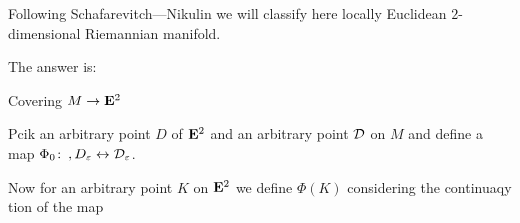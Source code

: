 
   Following Schafarevitch---Nikulin we will classify here
  locally Euclidean $2$-dimensional Riemannian manifold.




   The answer is:



\baselineskip=14pt
\def\vare {\varepsilon}
\def\A {{\bf A}}
\def\t {\tilde}
\def\bs {{\bf s}}
\def\a {\alpha}
\def\d {\delta}
\def\K {{\bf K}}
\def\N {{\bf N}}
\def\w {\omega}
\def\s {{\sigma}}
\def\S {{\Sigma}}
\def\s {{\sigma}}
\def\p{\partial}
\def\vare{{\varepsilon}}
\def\Q {{\bf Q}}
\def\D {{\cal D}}
\def\G {{\Gamma}}
\def\C {{\bf C}}
\def\L {{\cal L}}
\def\F {{\cal F}}
\def\Z {{\bf Z}}
\def\U  {{\cal U}}
\def\H {{\bf H}}
\def\R  {{\bf R}}
\def\S  {{\bf S}}
\def\E  {{\bf E}}
\def\l {\lambda}
\def\degree {{\bf {\rm degree}\,\,}}
\def \finish {${\,\,\vrule height1mm depth2mm width 8pt}$}
\def \m {\medskip}
\def\p {\partial}
\def\r {{\bf r}}
\def\pt {{\bf pt}}
\def\v {{\bf v}}
\def\n {{\bf n}}
\def\t {{\bf t}}
\def\b {{\bf b}}
\def\c {{\bf c }}
\def\e{{\bf e}}
\def\ac {{\bf a}}
\def \X   {{\bf X}}
\def \Y   {{\bf Y}}
\def \x   {{\bf x}}
\def \y   {{\bf y}}
\def\ss  {\sigma_{\rm sph}}
\def \grad {{\rm grad\,}}
\def\e {{\bf e}}
\def\f {{\bf f}}
\def\g {{\bf g}}





          
     \centerline {Covering  $M\to \E^2$ }

Pcik an arbitrary point $D$ of $\E^2$ and an arbitrary point
  $\cal D$ on $M$ and define a map  
$\Phi_0\colon \,,D_\vare\leftrightarrow {\cal D}_\vare$.

  Now for an arbitrary point $K$ on $\E^2$ we  define $\Phi(K)$
considering the continuaqy
tion of the map  



\bye
